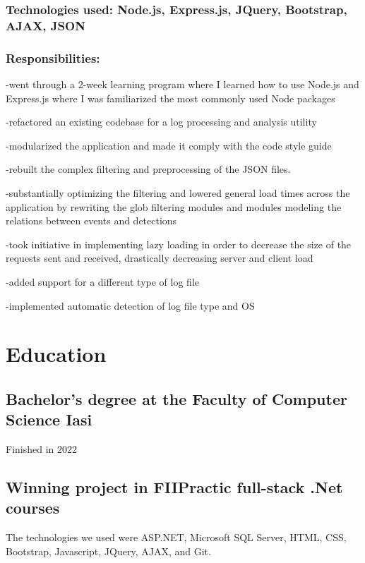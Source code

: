 \documentclass[a4paper,hidelinks,11pt]{article}
\begin{document}
\subsubsection{Technologies used: Node.js, Express.js, JQuery, Bootstrap, AJAX, JSON}
\subsubsection{Responsibilities:}
-went through a 2-week learning program where I learned how to use Node.js and Express.js where I was familiarized the most commonly used Node packages

-refactored an existing codebase for a log processing and analysis utility

-modularized the application and made it comply with the code style guide

-rebuilt the complex filtering and preprocessing of the JSON files.

-substantially optimizing the filtering and lowered general load times across the application by rewriting the glob filtering modules and modules modeling the relations between events and detections

-took initiative in implementing lazy loading in order to decrease the size of the requests sent and received, drastically decreasing server and client load

-added support for a different type of log file

-implemented automatic detection of log file type and OS

\section{Education}
\subsection{Bachelor's degree at the Faculty of Computer Science Iasi}
Finished in 2022

\subsection{Winning project in FIIPractic full-stack .Net courses}

The technologies we used were ASP.NET, Microsoft SQL Server, HTML, CSS, Bootstrap, Javascript,
JQuery, AJAX, and Git. 
\end{document}
